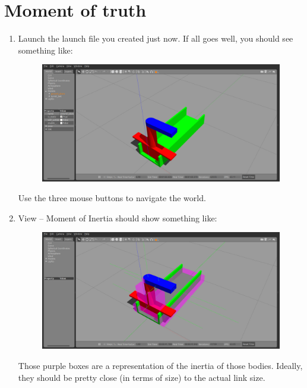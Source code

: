\documentclass{article}
\begin{document}
    \section{Moment of truth}
        \begin{enumerate}
            \item Launch the launch file you created just now. If all goes well, you should see something like:
            \begin{figure}[H]
                \center
                \includegraphics[width = \textwidth]{image_3.png}
            \end{figure}
            Use the three mouse buttons to navigate the world.
            \item View -- Moment of Inertia should show something like:
            \begin{figure}[H]
                \center
                \includegraphics[width = \textwidth]{image_4.png}
            \end{figure}
            Those purple boxes are a representation of the inertia of those bodies. Ideally, they 
            should be pretty close (in terms of size) to the actual link size.


\end{enumerate}
\end{document}
